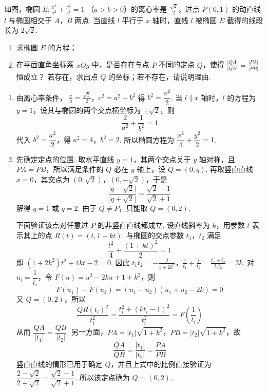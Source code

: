 \begin{problem}
如图，椭圆 \(E: \frac{x^2}{a^2} + \frac{y^2}{b^2} = 1 \) （\(a > b > 0\)）的离心率是 \(\frac{\sqrt{2}}{2}\)，过点 \(P(0,1)\) 的动直线 \(l\) 与椭圆相交于 \(A\)，\(B\) 两点. 当直线 \(l\) 平行于 \(x\) 轴时，直线 \(l\) 被椭圆 \(E\) 截得的线段长为 \(2\sqrt{2}\).

\begin{enumerate}
\item 求椭圆 \(E\) 的方程；
\item 在平面直角坐标系 \(xOy\) 中，是否存在与点 \(P\) 不同的定点 \(Q\)，使得 \(\frac{|QA|}{|QB|} = \frac{|PA|}{|PB|}\) 恒成立？ 若存在，求出点 \(Q\) 的坐标；若不存在，请说明理由.
\end{enumerate}
\begin{solution}
\begin{enumerate}
\item 由离心率条件，
\(\frac ca=\frac{\sqrt2}{2}\)，\(c^2=a^2-b^2\)
得 \(b^2=\dfrac{a^2}{2}\). 当 \(l\parallel x\) 轴时，\(l\) 的方程为 \(y=1\)，设其与椭圆的两个交点横坐标为 \(\pm\sqrt2\)，则
\[
\frac2{a^2}+\frac1{b^2}=1
\]
代入 \(b^2=\dfrac{a^2}{2}\)，得 \(a^2=4\)，\(b^2=2\). 所以椭圆方程为 \(\dfrac{x^2}{4}+\dfrac{y^2}{2}=1\).
\item 先确定定点的位置. 取水平直线 \(y=1\)，其两个交点关于 \(y\) 轴对称，且 \(PA=PB\)，所以满足条件的 \(Q\) 必在 \(y\) 轴上，设 \(Q=(0,q)\). 再取竖直直线 \(x=0\)，其交点为 \((0,\sqrt2)\)，\((0,-\sqrt2)\)，于是
\[
\frac{\lvert q-\sqrt2\rvert}{\lvert q+\sqrt2\rvert}
=\frac{\sqrt2-1}{\sqrt2+1}
\]
解得 \(q=1\) 或 \(q=2\). 由于 \(Q\ne P\)，只能取 \(Q=(0,2)\).

下面验证该点对任意过 \(P\) 的非竖直直线都成立. 设直线斜率为 \(k\)，用参数 \(t\) 表示其上的点 \(R(t)=(t,1+kt)\). 与椭圆的交点参数 \(t_1\)，\(t_2\) 满足
\[
\frac{t^2}{4}+\frac{(1+kt)^2}{2}=1
\]
即 \((1+2k^2)t^2+4kt-2=0\). 因此
\(t_1t_2=-\frac2{1+2k^2}\)，\(\frac1{t_1}+\frac1{t_2}=\frac{t_1+t_2}{t_1t_2}=2k\).
对 \(u_i=\dfrac1{t_i}\)，令 \(F(u)=u^2-2ku+1+k^2\)，则
\[
F(u_1)-F(u_2)=(u_1-u_2)(u_1+u_2-2k)=0
\]
又 \(Q=(0,2)\)，所以
\[
\frac{QR(t_i)^2}{t_i^2}
=\frac{t_i^2+(kt_i-1)^2}{t_i^2}
=F\left(\frac1{t_i}\right)
\]
从而 \(\dfrac{QA}{\lvert t_1\rvert}=\dfrac{QB}{\lvert t_2\rvert}\). 另一方面，\(PA=\lvert t_1\rvert\sqrt{1+k^2}\)，\(PB=\lvert t_2\rvert\sqrt{1+k^2}\)，故
\[
\frac{QA}{QB}=\frac{\lvert t_1\rvert}{\lvert t_2\rvert}=\frac{PA}{PB}
\]
竖直直线的情形已用于确定 \(Q\)，并且上式中的比例直接验证为 \(\dfrac{2-\sqrt2}{2+\sqrt2}=\dfrac{\sqrt2-1}{\sqrt2+1}\). 所以该定点确为 \(Q=(0,2)\).
\end{enumerate}
\end{solution}
\end{problem}

